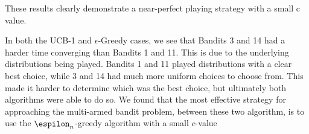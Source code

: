 These results clearly demonstrate a near-perfect playing strategy with a small c value.

In both the UCB-1 and $\epsilon$-Greedy cases, we see that Bandits 3 and 14 had a harder time converging than Bandits 1 and 11. This is due to the underlying distributions being played. Bandits 1 and 11 played distributions with a clear best choice, while 3 and 14 had much more uniform choices to choose from. This made it harder to determine which was the best choice, but ultimately both algorithms were able to do so. We found that the most effective strategy for approaching the multi-armed bandit problem, between these two algorithm, is to use the $\espilon_n$-greedy algorithm with a small $c$-value

